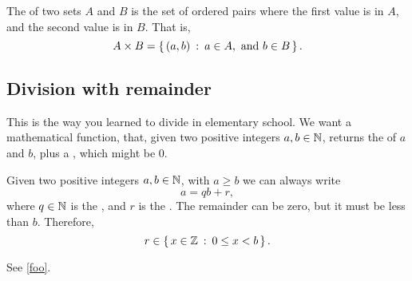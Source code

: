 \begin{definition}
  The  of two sets $A$ and $B$ is the set of
  ordered pairs where the first value is in $A$, and the second value
  is in $B$. That is,
  $$A \times B = \left\{\, (a, b) \::\: a \in A, \text{ and } b \in B \,\right\}.$$
\end{definition}

\begin{definition}
    
\end{definition}

\subsection{Division with remainder}

This is the way you learned to divide in elementary school. We want a
mathematical function, that, given two positive integers $a, b \in
\mathbb{N}$, returns the  of $a$ and $b$, plus a
, which might be $0$.

\begin{lemma}
  Given two positive integers $a, b \in \mathbb{N}$, with $a \ge b$ we can
  always write $$a = qb + r,$$ where $q \in \mathbb{N}$ is the
  , and $r$ is the . The remainder can
  be zero, but it must be less than $b$. Therefore,
  $$r \in \left\{\, x \in \mathbb{Z} \::\: 0 \le x < b \,\right\}.$$
\end{lemma}


See \cref{foo}.